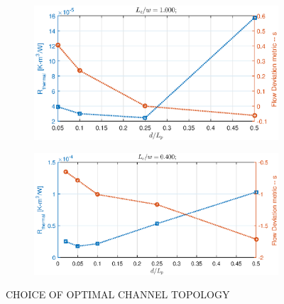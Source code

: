 \documentclass[twocolumn,10pt,cleanfoot]{ihmtc}
\begin{document}
\begin{figure}
\centering
   \begin{subfigure}[b]{0.55\textwidth}
   \includegraphics[width=0.85\linewidth]{optgeo_a.eps}
   \caption{}
   \label{optgeo_a} 
\end{subfigure}
%
   \begin{subfigure}[b]{0.55\textwidth}
   \includegraphics[width=0.85\linewidth]{optgeo_b.eps}
   \caption{}
   \label{optgeo_b} 
\end{subfigure}
%
%
%
\caption{CHOICE OF OPTIMAL CHANNEL TOPOLOGY}
\vspace{-3em}
\end{figure}
%
%
\end{document}
